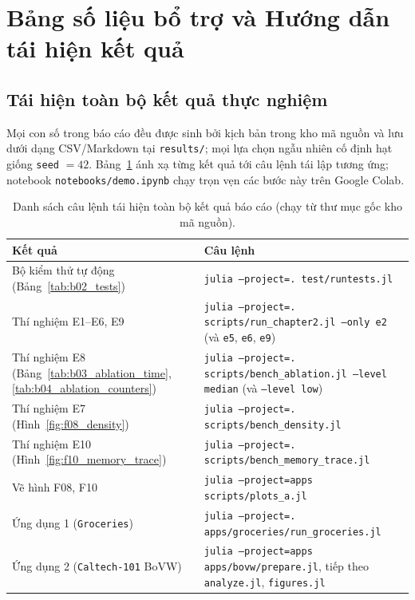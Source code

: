\section{Bảng số liệu bổ trợ và Hướng dẫn tái hiện kết quả}
\label{sec:07_appendix}

\subsection{Tái hiện toàn bộ kết quả thực nghiệm}
\label{subsec:appendix_reproduce}

Mọi con số trong báo cáo đều được sinh bởi kịch bản trong kho mã nguồn và lưu dưới dạng CSV/Markdown tại \texttt{results/}; mọi lựa chọn ngẫu nhiên cố định hạt giống \texttt{seed} $= 42$. Bảng~\ref{tab:appendix_commands} ánh xạ từng kết quả tới câu lệnh tái lập tương ứng; notebook \texttt{notebooks/demo.ipynb} chạy trọn vẹn các bước này trên Google Colab.

\begin{table}[!t]
\centering
\caption{Danh sách câu lệnh tái hiện toàn bộ kết quả báo cáo (chạy từ thư mục gốc kho mã nguồn).}
\label{tab:appendix_commands}
\scriptsize
\begin{tabular}{@{}p{4.6cm}p{11.4cm}@{}}
\toprule
Kết quả & Câu lệnh \\
\midrule
Bộ kiểm thử tự động (Bảng~\ref{tab:b02_tests}) & \texttt{julia --project=. test/runtests.jl} \\
Thí nghiệm E1--E6, E9 & \texttt{julia --project=. scripts/run\_chapter2.jl --only e2} (và \texttt{e5}, \texttt{e6}, \texttt{e9}) \\
Thí nghiệm E8 (Bảng~\ref{tab:b03_ablation_time}, \ref{tab:b04_ablation_counters}) & \texttt{julia --project=. scripts/bench\_ablation.jl --level median} (và \texttt{--level low}) \\
Thí nghiệm E7 (Hình~\ref{fig:f08_density}) & \texttt{julia --project=. scripts/bench\_density.jl} \\
Thí nghiệm E10 (Hình~\ref{fig:f10_memory_trace}) & \texttt{julia --project=. scripts/bench\_memory\_trace.jl} \\
Vẽ hình F08, F10 & \texttt{julia --project=apps scripts/plots\_a.jl} \\
Ứng dụng 1 (\texttt{Groceries}) & \texttt{julia --project=. apps/groceries/run\_groceries.jl} \\
Ứng dụng 2 (\texttt{Caltech-101} BoVW) & \texttt{julia --project=apps apps/bovw/prepare.jl}, tiếp theo \texttt{analyze.jl}, \texttt{figures.jl} \\
\bottomrule
\end{tabular}
\end{table}

